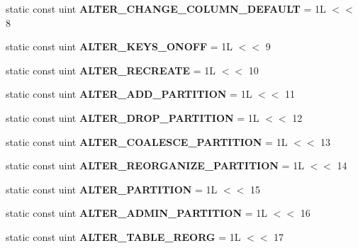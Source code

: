\begin{DoxyCompactItemize}
static const uint {\bfseries A\+L\+T\+E\+R\+\_\+\+C\+H\+A\+N\+G\+E\+\_\+\+C\+O\+L\+U\+M\+N\+\_\+\+D\+E\+F\+A\+U\+LT} = 1\+L $<$$<$ 8
\item 
\mbox{\label{classAlter__info_a77d4dada10937d9dc8aaa56e7a47c931}} 
static const uint {\bfseries A\+L\+T\+E\+R\+\_\+\+K\+E\+Y\+S\+\_\+\+O\+N\+O\+FF} = 1\+L $<$$<$ 9
\item 
\mbox{\label{classAlter__info_a4821a8d826cfb1053142ed0b47d6640e}} 
static const uint {\bfseries A\+L\+T\+E\+R\+\_\+\+R\+E\+C\+R\+E\+A\+TE} = 1\+L $<$$<$ 10
\item 
\mbox{\label{classAlter__info_a58f5dd70db37a80b3b62dc4522049ab1}} 
static const uint {\bfseries A\+L\+T\+E\+R\+\_\+\+A\+D\+D\+\_\+\+P\+A\+R\+T\+I\+T\+I\+ON} = 1\+L $<$$<$ 11
\item 
\mbox{\label{classAlter__info_a257c8df105e54bda066806c25aa7b466}} 
static const uint {\bfseries A\+L\+T\+E\+R\+\_\+\+D\+R\+O\+P\+\_\+\+P\+A\+R\+T\+I\+T\+I\+ON} = 1\+L $<$$<$ 12
\item 
\mbox{\label{classAlter__info_a405d92a75856431b2d171926471517e7}} 
static const uint {\bfseries A\+L\+T\+E\+R\+\_\+\+C\+O\+A\+L\+E\+S\+C\+E\+\_\+\+P\+A\+R\+T\+I\+T\+I\+ON} = 1\+L $<$$<$ 13
\item 
\mbox{\label{classAlter__info_af784905691eb5058c718d27c6177d42c}} 
static const uint {\bfseries A\+L\+T\+E\+R\+\_\+\+R\+E\+O\+R\+G\+A\+N\+I\+Z\+E\+\_\+\+P\+A\+R\+T\+I\+T\+I\+ON} = 1\+L $<$$<$ 14
\item 
\mbox{\label{classAlter__info_ad1750142a820dba59e885f250b81d45f}} 
static const uint {\bfseries A\+L\+T\+E\+R\+\_\+\+P\+A\+R\+T\+I\+T\+I\+ON} = 1\+L $<$$<$ 15
\item 
\mbox{\label{classAlter__info_a1fc8a4335b267f7322447c162b949b24}} 
static const uint {\bfseries A\+L\+T\+E\+R\+\_\+\+A\+D\+M\+I\+N\+\_\+\+P\+A\+R\+T\+I\+T\+I\+ON} = 1\+L $<$$<$ 16
\item 
\mbox{\label{classAlter__info_addf292478f3191d072b5ebacf3346335}} 
static const uint {\bfseries A\+L\+T\+E\+R\+\_\+\+T\+A\+B\+L\+E\+\_\+\+R\+E\+O\+RG} = 1\+L $<$$<$ 17

\end{DoxyCompactItemize}
